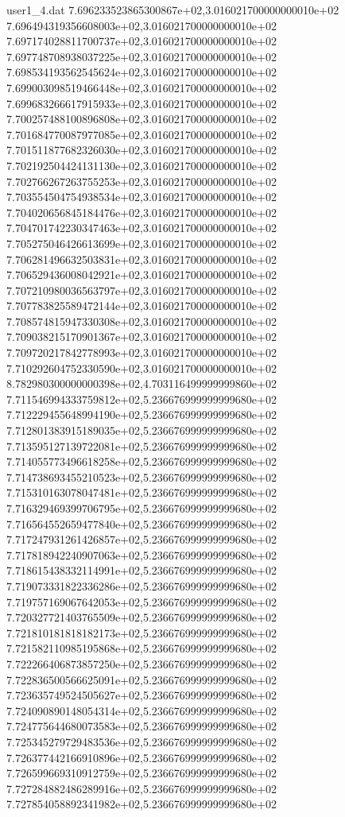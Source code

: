 \begin{filecontents}{user1_4.dat}
7.696233523865300867e+02,3.016021700000000010e+02
7.696494319356608003e+02,3.016021700000000010e+02
7.697174028811700737e+02,3.016021700000000010e+02
7.697748708938037225e+02,3.016021700000000010e+02
7.698534193562545624e+02,3.016021700000000010e+02
7.699003098519466448e+02,3.016021700000000010e+02
7.699683266617915933e+02,3.016021700000000010e+02
7.700257488100896808e+02,3.016021700000000010e+02
7.701684770087977085e+02,3.016021700000000010e+02
7.701511877682326030e+02,3.016021700000000010e+02
7.702192504424131130e+02,3.016021700000000010e+02
7.702766267263755253e+02,3.016021700000000010e+02
7.703554504754938534e+02,3.016021700000000010e+02
7.704020656845184476e+02,3.016021700000000010e+02
7.704701742230347463e+02,3.016021700000000010e+02
7.705275046426613699e+02,3.016021700000000010e+02
7.706281496632503831e+02,3.016021700000000010e+02
7.706529436008042921e+02,3.016021700000000010e+02
7.707210980036563797e+02,3.016021700000000010e+02
7.707783825589472144e+02,3.016021700000000010e+02
7.708574815947330308e+02,3.016021700000000010e+02
7.709038215170901367e+02,3.016021700000000010e+02
7.709720217842778993e+02,3.016021700000000010e+02
7.710292604752330590e+02,3.016021700000000010e+02
8.782980300000000398e+02,4.703116499999999860e+02
7.711546994333759812e+02,5.236676999999999680e+02
7.712229455648994190e+02,5.236676999999999680e+02
7.712801383915189035e+02,5.236676999999999680e+02
7.713595127139722081e+02,5.236676999999999680e+02
7.714055773496618258e+02,5.236676999999999680e+02
7.714738693455210523e+02,5.236676999999999680e+02
7.715310163078047481e+02,5.236676999999999680e+02
7.716329469399706795e+02,5.236676999999999680e+02
7.716564552659477840e+02,5.236676999999999680e+02
7.717247931261426857e+02,5.236676999999999680e+02
7.717818942240907063e+02,5.236676999999999680e+02
7.718615438332114991e+02,5.236676999999999680e+02
7.719073331822336286e+02,5.236676999999999680e+02
7.719757169067642053e+02,5.236676999999999680e+02
7.720327721403765509e+02,5.236676999999999680e+02
7.721810181818182173e+02,5.236676999999999680e+02
7.721582110985195868e+02,5.236676999999999680e+02
7.722266406873857250e+02,5.236676999999999680e+02
7.722836500566625091e+02,5.236676999999999680e+02
7.723635749524505627e+02,5.236676999999999680e+02
7.724090890148054314e+02,5.236676999999999680e+02
7.724775644680073583e+02,5.236676999999999680e+02
7.725345279729483536e+02,5.236676999999999680e+02
7.726377442166910896e+02,5.236676999999999680e+02
7.726599669310912759e+02,5.236676999999999680e+02
7.727284882486289916e+02,5.236676999999999680e+02
7.727854058892341982e+02,5.236676999999999680e+02

\end{filecontents}
